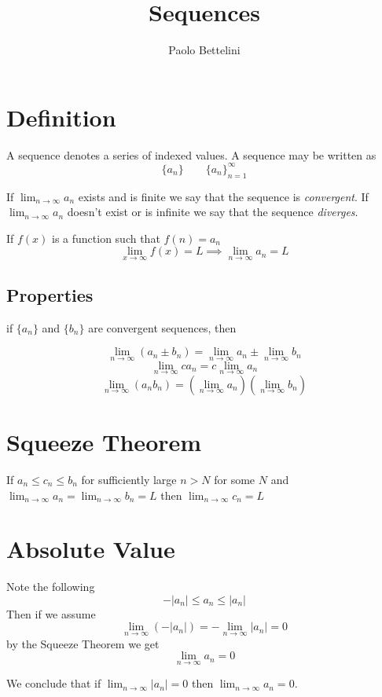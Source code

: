 \documentclass{article}
\title{Sequences}
\author{Paolo Bettelini}
\date{}
\begin{document}
\maketitle
\tableofcontents
\pagebreak

\section{Definition}

A sequence denotes a series of indexed values.
A sequence may be written as
\[
    \{a_n\} \quad \quad {\{a_n\}}_{n=1}^\infty
\]

If \(\lim_{n \to \infty}a_n\) exists and is finite
we say that the sequence is \textit{convergent}. If 
\(\lim_{n \to \infty}a_n\) doesn't exist or is infinite
we say that the sequence \textit{diverges}.

If \(f(x)\) is a function such that \(f(n)=a_n\)
\[
    \lim_{x\to\infty}f(x)=L \implies
    \lim_{n\to\infty}a_n=L
\]

\subsection{Properties}

if \(\{a_n\}\) and \(\{b_n\}\) are convergent sequences, then

\[
    \lim_{n\to\infty} (a_n \pm b_n) = \lim_{n\to\infty} a_n \pm
    \lim_{n\to\infty} b_n
\]
\[
    \lim_{n\to\infty} ca_n = c \lim_{n\to\infty} a_n
\]
\[
    \lim_{n\to\infty} (a_n b_n) =
    \left(\lim_{n\to\infty} a_n\right)
    \left(\lim_{n\to\infty} b_n\right)
\]

\section{Squeeze Theorem}

If \(a_n \leq c_n \leq b_n\) for sufficiently large \(n>N\) for some \(N\)
and \(\lim_{n\to\infty}a_n =\lim_{n\to\infty}b_n=L\)
then \(\lim_{n\to\infty} c_n =L\)

\section{Absolute Value}

Note the following
\[
    -|a_n| \leq a_n \leq |a_n|
\]
Then if we assume
\[
    \lim_{n\to\infty} (-|a_n|) = - \lim_{n\to\infty} |a_n| =0 
\]
by the Squeeze Theorem we get
\[
    \lim_{n\to\infty} a_n =0
\]

We conclude that if \(\lim_{n\to\infty} |a_n|=0\) then
\(\lim_{n\to\infty} a_n=0\).
\end{document}
